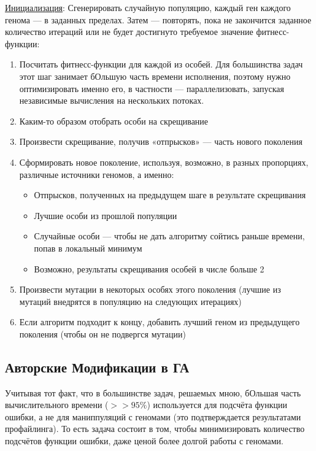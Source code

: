 \underline{Инициализация}: Сгенерировать случайную популяцию, каждый ген каждого генома — в заданных пределах.
Затем — повторять, пока не закончится заданное количество итераций или не будет достигнуто требуемое значение фитнесс-функции:
\begin{enumerate}
    \item Посчитать фитнесс-функции для каждой из особей.
    Для большинства задач этот шаг занимает бОльшую часть времени исполнения, поэтому нужно оптимизировать именно его, в частности — параллелизовать, запуская независимые вычисления на нескольких потоках.
    \item Каким-то образом отобрать особи на скрещивание
    \item Произвести скрещивание, получив «отпрысков» — часть нового поколения
    \item Сформировать новое поколение, используя, возможно, в разных пропорциях, различные источники геномов, а именно:
            \begin{itemize}
                \item Отпрысков, полученных на предыдущем шаге в результате скрещивания
                \item Лучшие особи из прошлой популяции
                \item Случайные особи —  чтобы не дать алгоритму сойтись раньше времени, попав в локальный минимум
                \item Возможно, результаты скрещивания особей в числе больше 2
            \end{itemize}
    \item Произвести мутации в некоторых особях этого поколения (лучшие из мутаций внедрятся в популяцию на следующих итерациях)
    \item Если алгоритм подходит к концу, добавить лучший геном из предыдущего поколения (чтобы он не подвергся мутации)
\end{enumerate}

\subsection{Авторские Модификации  в ГА}\label{sec:my_modifications}

Учитывая тот факт, что в большинстве задач, решаемых мною, бОльшая часть вычислительного времени ($>> 95\%$) используется для подсчёта функции ошибки, а не для маниппуляций с геномами
(это подтверждается результатами профайлинга).
То есть задача состоит в том, чтобы минимизировать количество подсчётов функции ошибки, даже ценой более долгой работы с геномами.

